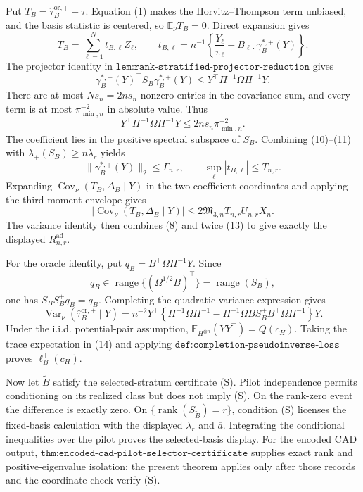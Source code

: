 Put \(T_B=\widehat\tau_B^{\mathrm{or},+}-\tau\).  Equation (1) makes the Horvitz--Thompson term unbiased, and the basis statistic is centered, so \(\mathbb E_\nu T_B=0\).  Direct expansion gives
\[
T_B=\sum_{\ell=1}^{N}t_{B,\ell}Z_\ell,
\qquad
t_{B,\ell}=n^{-1}\left\{\frac{Y_\ell}{\pi_\ell}
-B_{\ell\cdot}\gamma_B^{*,+}(Y)\right\}.
\tag{9}
\]
The projector identity in \(\texttt{lem:rank-stratified-projector-reduction}\) gives
\[
\gamma_B^{*,+}(Y)^\top S_B\gamma_B^{*,+}(Y)
\le Y^\top\Pi^{-1}\Omega\Pi^{-1}Y.
\tag{10}
\]
There are at most \(Ns_n=2ns_n\) nonzero entries in the covariance sum, and every term is at most \(\pi_{\min,n}^{-2}\) in absolute value.  Thus
\[
Y^\top\Pi^{-1}\Omega\Pi^{-1}Y
\le2ns_n\pi_{\min,n}^{-2}.
\tag{11}
\]
The coefficient lies in the positive spectral subspace of \(S_B\).  Combining (10)--(11) with \(\lambda_+(S_B)\ge n\lambda_r\) yields
\[
\lVert\gamma_B^{*,+}(Y)\rVert_2\le\Gamma_{n,r},
\qquad
\sup_\ell|t_{B,\ell}|\le T_{n,r}.
\tag{12}
\]
Expanding \(\operatorname{Cov}_\nu(T_B,\Delta_B\mid Y)\) in the two coefficient coordinates and applying the third-moment envelope gives
\[
|\operatorname{Cov}_\nu(T_B,\Delta_B\mid Y)|
\le2\mathfrak M_{3,n}T_{n,r}U_{n,r}X_n.
\tag{13}
\]
The variance identity then combines (8) and twice (13) to give exactly the displayed \(R_{n,r}^{\mathrm{ad}}\).

For the oracle identity, put \(q_B=B^\top\Omega\Pi^{-1}Y\).  Since
\[
q_B\in\operatorname{range}\{(\Omega^{1/2}B)^\top\}
=\operatorname{range}(S_B),
\]
one has \(S_BS_B^+q_B=q_B\).  Completing the quadratic variance expression gives
\[
\operatorname{Var}_\nu(\widehat\tau_B^{\mathrm{or},+}\mid Y)
=n^{-2}Y^\top\left\{\Pi^{-1}\Omega\Pi^{-1}
-\Pi^{-1}\Omega BS_B^+B^\top\Omega\Pi^{-1}\right\}Y.
\tag{14}
\]
Under the i.i.d. potential-pair assumption, \(\mathbb E_{H^{\otimes n}}(YY^\top)=Q(c_H)\).  Taking the trace expectation in (14) and applying \(\texttt{def:completion-pseudoinverse-loss}\) proves \(\ell_B^+(c_H)\).

Now let \(\widetilde B\) satisfy the selected-stratum certificate (S).  Pilot independence permits conditioning on its realized class but does not imply (S).  On the rank-zero event the difference is exactly zero.  On \(\{\operatorname{rank}(S_{\widetilde B})=r\}\), condition (S) licenses the fixed-basis calculation with the displayed \(\lambda_r\) and \(\overline a\).  Integrating the conditional inequalities over the pilot proves the selected-basis display.  For the encoded CAD output, \(\texttt{thm:encoded-cad-pilot-selector-certificate}\) supplies exact rank and positive-eigenvalue isolation; the present theorem applies only after those records and the coordinate check verify (S).

